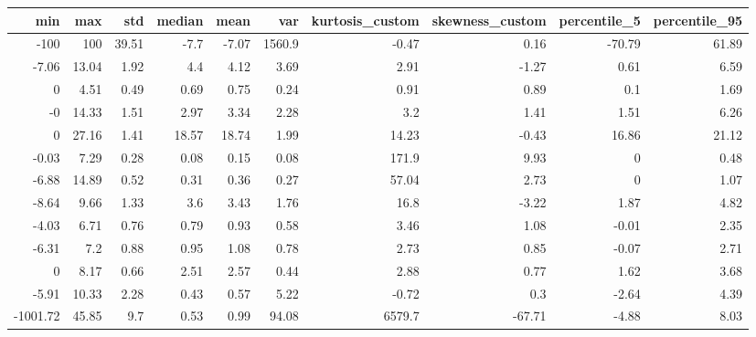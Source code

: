 \begin{tabular}{rrrrrrrrrr}
\hline
        min &     max &     std &   median &   mean &              var &   kurtosis\_custom &   skewness\_custom &   percentile\_5 &   percentile\_95 \\
\hline
    -100    &  100    &   39.51 &    -7.7  &  -7.07 &   1560.9         &             -0.47 &              0.16 &         -70.79 &           61.89 \\
      -7.06 &   13.04 &    1.92 &     4.4  &   4.12 &      3.69        &              2.91 &             -1.27 &           0.61 &            6.59 \\
       0    &    4.51 &    0.49 &     0.69 &   0.75 &      0.24        &              0.91 &              0.89 &           0.1  &            1.69 \\
      -0    &   14.33 &    1.51 &     2.97 &   3.34 &      2.28        &              3.2  &              1.41 &           1.51 &            6.26 \\
       0    &   27.16 &    1.41 &    18.57 &  18.74 &      1.99        &             14.23 &             -0.43 &          16.86 &           21.12 \\
      -0.03 &    7.29 &    0.28 &     0.08 &   0.15 &      0.08        &            171.9  &              9.93 &           0    &            0.48 \\
      -6.88 &   14.89 &    0.52 &     0.31 &   0.36 &      0.27        &             57.04 &              2.73 &           0    &            1.07 \\
      -8.64 &    9.66 &    1.33 &     3.6  &   3.43 &      1.76        &             16.8  &             -3.22 &           1.87 &            4.82 \\
      -4.03 &    6.71 &    0.76 &     0.79 &   0.93 &      0.58        &              3.46 &              1.08 &          -0.01 &            2.35 \\
      -6.31 &    7.2  &    0.88 &     0.95 &   1.08 &      0.78        &              2.73 &              0.85 &          -0.07 &            2.71 \\
       0    &    8.17 &    0.66 &     2.51 &   2.57 &      0.44        &              2.88 &              0.77 &           1.62 &            3.68 \\
      -5.91 &   10.33 &    2.28 &     0.43 &   0.57 &      5.22        &             -0.72 &              0.3  &          -2.64 &            4.39 \\
   -1001.72 &   45.85 &    9.7  &     0.53 &   0.99 &     94.08        &           6579.7  &            -67.71 &          -4.88 &            8.03 \\

\end{tabular}
